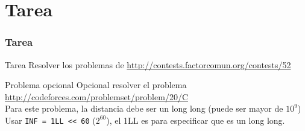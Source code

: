 \documentclass{beamer}
\begin{document}
\section{Tarea}
	\begin{frame}[fragile]
		\frametitle{Tarea}
		\begin{alertblock}{Tarea}
			Resolver los problemas de \url{http://contests.factorcomun.org/contests/52}
		\end{alertblock}
		\begin{exampleblock}{Problema opcional}
			Opcional resolver el problema \url{http://codeforces.com/problemset/problem/20/C}\\
			Para este problema, la distancia debe ser un long long (puede ser mayor de $10^9$)\\
			Usar \verb|INF = 1LL << 60| ($2^{60}$), el 1LL es para especificar que es un long long.\\
		\end{exampleblock}
	\end{frame}
\end{document}
